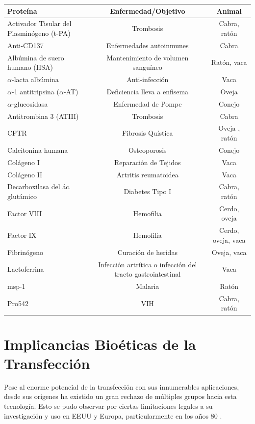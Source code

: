 \documentclass[fleqn,10pt]{SelfArx} %
\begin{document}
\begin{table}[ht]
\begin{center}
\begin{tabular}{|l|c|c|} \hline
Proteína & Enfermedad/Objetivo & Animal \\ \hline
Activador Tisular del Plasmin\'ogeno (t-PA) &Trombosis & Cabra, rat\'on \\ \hline
Anti-CD137 & Enfermedades autoinmunes & Cabra \\ \hline
Albúmina de suero humano (HSA) & Mantenimiento de volumen sanguíneo & Ratón, vaca \\ \hline
$\alpha$-lacta albúmina & Anti-infección & Vaca \\ \hline
$\alpha$-1 antitripsina ($\alpha$-AT) & Deficiencia lleva a enfisema & Oveja \\ \hline
$\alpha$-glucosidasa & Enfermedad de Pompe & Conejo \\ \hline
Antitrombina 3 (ATIII) & Trombosis & Cabra \\ \hline
CFTR & Fibrosis Quística & Oveja , ratón \\ \hline
Calcitonina humana & Osteoporosis & Conejo \\ \hline
Colágeno I & Reparación de Tejidos & Vaca \\ \hline
Colágeno II & Artritis reumatoidea & Vaca \\ \hline
Decarboxilasa del ác. glutámico & Diabetes Tipo I & Cabra, ratón \\ \hline
Factor VIII & Hemofilia & Cerdo, oveja \\ \hline
Factor IX & Hemofilia & Cerdo, oveja, vaca \\ \hline
Fibrinógeno & Curación de heridas & Oveja, vaca \\ \hline
Lactoferrina & Infección artrítica o infección del tracto gastrointestinal & Vaca \\ \hline
msp-1 & Malaria & Ratón \\ \hline
Pro542 & VIH & Cabra, ratón \\ \hline
\end{tabular}
\end{center}
\end{table}

\section{Implicancias Bioéticas de la Transfección}

Pese al enorme potencial de la transfección con sus innumerables aplicaciones, desde sus origenes ha existido un gran rechazo de múltiples grupos hacia esta tecnología. Esto se pudo observar por ciertas limitaciones legales a su investigación y uso en EEUU y Europa, particularmente en los años 80 \cite{Spink} .





\end{document}

